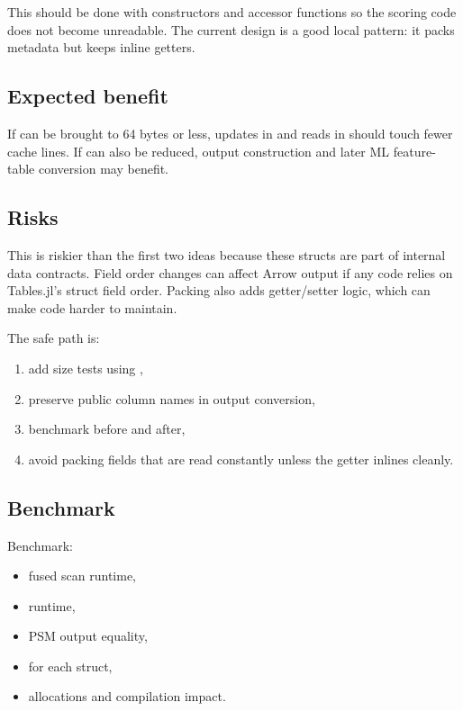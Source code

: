 \documentclass[11pt]{article}
\begin{document}
This should be done with constructors and accessor functions so the scoring code
does not become unreadable. The current  design is a good local
pattern: it packs metadata but keeps inline getters.

\subsection*{Expected benefit}

If  can be brought to 64 bytes or less, updates in
 and reads in  should touch fewer cache
lines. If  can also be reduced, output construction
and later ML feature-table conversion may benefit.

\subsection*{Risks}

This is riskier than the first two ideas because these structs are part of
internal data contracts. Field order changes can affect Arrow output if any code
relies on Tables.jl's struct field order. Packing also adds getter/setter logic,
which can make code harder to maintain.

The safe path is:

\begin{enumerate}
  \item add size tests using ,
  \item preserve public column names in output conversion,
  \item benchmark before and after,
  \item avoid packing fields that are read constantly unless the getter inlines
        cleanly.
\end{enumerate}

\subsection*{Benchmark}

Benchmark:

\begin{itemize}
  \item fused scan runtime,
  \item {} runtime,
  \item PSM output equality,
  \item {} for each struct,
  \item allocations and compilation impact.
\end{itemize}
\end{document}
